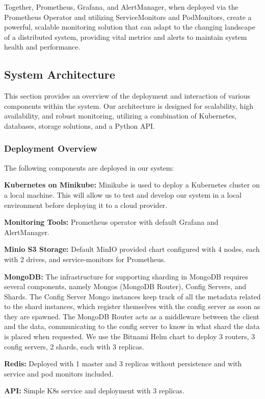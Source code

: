 \documentclass{report}
\begin{document}
    Together, Prometheus, Grafana, and AlertManager, when deployed via the Prometheus Operator and utilizing ServiceMonitors and PodMonitors, create a powerful, scalable monitoring solution that can adapt to the changing landscape of a distributed system, providing vital metrics and alerts to maintain system health and performance.

    \subsection{System Architecture}
    This section provides an overview of the deployment and interaction of various components within the system. Our architecture is designed for scalability, high availability, and robust monitoring, utilizing a combination of Kubernetes, databases, storage solutions, and a Python API.

    \subsubsection{Deployment Overview}
    The following components are deployed in our system:

    \textbf{Kubernetes on Minikube:} Minikube is used to deploy a Kubernetes cluster on a local machine. This will allow us to test and develop our system in a local environment before deploying it to a cloud provider.

    \textbf{Monitoring Tools:} Prometheus operator with default Grafana and AlertManager.

    \textbf{Minio S3 Storage:} Default MinIO provided chart configured with 4 nodes, each with 2 drives, and service-monitors for Prometheus.

    \textbf{MongoDB:} The infrastructure for supporting sharding in MongoDB requires several components, namely Mongos (MongoDB Router), Config Servers, and Shards. The Config Server Mongo instances keep track of all the metadata related to the shard instances, which register themselves with the config server as soon as they are spawned. The MongoDB Router acts as a middleware between the client and the data, communicating to the config server to know in what shard the data is placed when requested. We use the Bitnami Helm chart to deploy 3 routers, 3 config servers, 2 shards, each with 3 replicas.

    \textbf{Redis:} Deployed with 1 master and 3 replicas without persistence and with service and pod monitors included.

    \textbf{API:} Simple K8s service and deployment with 3 replicas.
\end{document}
